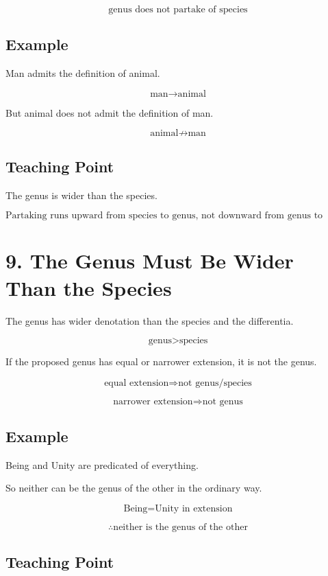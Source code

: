 \documentclass[12pt]{article}
\begin{document}
\[
\text{genus does not partake of species}
\]

\subsection*{Example}

Man admits the definition of animal.

\[
\text{man} \rightarrow \text{animal}
\]

But animal does not admit the definition of man.

\[
\text{animal} \not\rightarrow \text{man}
\]

\subsection*{Teaching Point}

The genus is wider than the species.

\[
\boxed{
\text{Partaking runs upward from species to genus, not downward from genus to species.}
}
\]

\section*{9. The Genus Must Be Wider Than the Species}

The genus has wider denotation than the species and the differentia.

\[
\text{genus} > \text{species}
\]

If the proposed genus has equal or narrower extension, it is not the genus.

\[
\text{equal extension} \Rightarrow \text{not genus/species}
\]

\[
\text{narrower extension} \Rightarrow \text{not genus}
\]

\subsection*{Example}

Being and Unity are predicated of everything.

So neither can be the genus of the other in the ordinary way.

\[
\text{Being} = \text{Unity in extension}
\]

\[
\therefore \text{neither is the genus of the other}
\]

\subsection*{Teaching Point}
\end{document}
